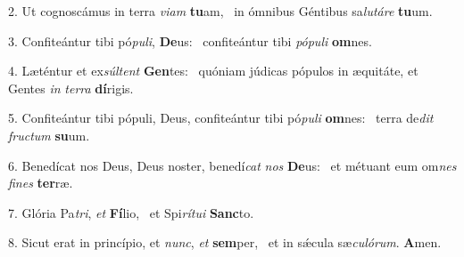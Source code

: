 2. Ut cognoscámus in terra \textit{vi}\textit{am} \textbf{tu}am, \ast\  in ómnibus Géntibus sa\textit{lu}\textit{tá}\textit{re} \textbf{tu}um.\

3. Confiteántur tibi pó\textit{pu}\textit{li}, \textbf{De}us: \ast\  confiteántur tibi \textit{pó}\textit{pu}\textit{li} \textbf{om}nes.\

4. Læténtur et ex\textit{súl}\textit{tent} \textbf{Gen}tes: \ast\  quóniam júdicas pópulos in æquitáte, et Gentes \textit{in} \textit{ter}\textit{ra} \textbf{dí}rigis.\

5. Confiteántur tibi pópuli, Deus, confiteántur tibi pó\textit{pu}\textit{li} \textbf{om}nes: \ast\  terra de\textit{dit} \textit{fruc}\textit{tum} \textbf{su}um.\

6. Benedícat nos Deus, Deus noster, benedí\textit{cat} \textit{nos} \textbf{De}us: \ast\  et métuant eum om\textit{nes} \textit{fi}\textit{nes} \textbf{ter}ræ.\

7. Glória Pa\textit{tri}, \textit{et} \textbf{Fí}lio, \ast\  et Spi\textit{rí}\textit{tu}\textit{i} \textbf{Sanc}to.\

8. Sicut erat in princípio, et \textit{nunc}, \textit{et} \textbf{sem}per, \ast\  et in sǽcula sæ\textit{cu}\textit{ló}\textit{rum}. \textbf{A}men.\

